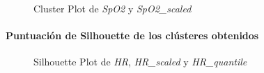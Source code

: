 \begin{figure}[ht]
    \centering
    \hfill
    \caption{Cluster Plot de \textit{SpO2} y \textit{SpO2\_scaled}}\label{fig:acf_pc_spo2}
\end{figure}


\paragraph{Puntuación de Silhouette de los clústeres obtenidos}

\begin{figure}[H]
    \centering
    \caption{Silhouette Plot de \textit{HR}, \textit{HR\_scaled} y \textit{HR\_quantile}}\label{fig:acf_si_fc}
\end{figure}

